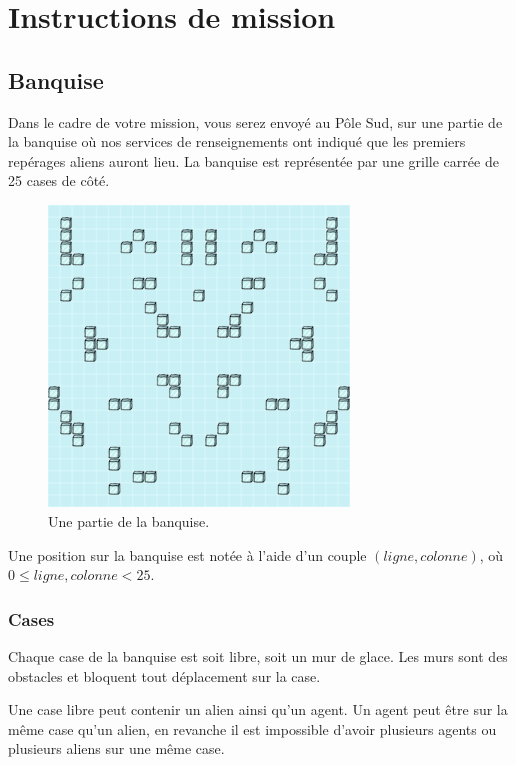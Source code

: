 
\section{Instructions de mission}\label{instructions-de-mission}

\subsection{Banquise}\label{banquise}

Dans le cadre de votre mission, vous serez envoyé au Pôle Sud, sur une
partie de la banquise où nos services de renseignements ont indiqué que
les premiers repérages aliens auront lieu. La banquise est représentée
par une grille carrée de 25 cases de côté.

\begin{figure}[!h]
    \centering
    \includegraphics[width=8cm]{img/map.png}
    \caption*{Une partie de la banquise.}
\end{figure}

Une position sur la banquise est notée à l'aide d'un couple $(ligne,
colonne)$, où $0 \leq ligne, colonne < 25$.

\subsubsection{Cases}\label{cases}

Chaque case de la banquise est soit libre, soit un mur de glace. Les
murs sont des obstacles et bloquent tout déplacement sur la case.

Une case libre peut contenir un alien ainsi qu'un agent. Un agent peut
être sur la même case qu'un alien, en revanche il est impossible d'avoir
plusieurs agents ou plusieurs aliens sur une même case.


